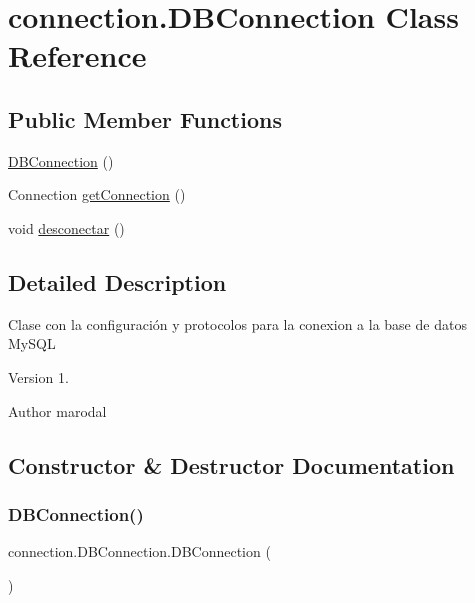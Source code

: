 \hypertarget{classconnection_1_1_d_b_connection}{}\section{connection.\+D\+B\+Connection Class Reference}
\label{classconnection_1_1_d_b_connection}
\subsection*{Public Member Functions}
\begin{DoxyCompactItemize}
\item 
\mbox{\hyperlink{classconnection_1_1_d_b_connection_a588cbdf335610da01f0c6c751e8f5593}{D\+B\+Connection}} ()
\item 
Connection \mbox{\hyperlink{classconnection_1_1_d_b_connection_a634bde0075766d2e075830387f970879}{get\+Connection}} ()
\item 
void \mbox{\hyperlink{classconnection_1_1_d_b_connection_a194f7d7848f479d3779f0c356d2ff6fa}{desconectar}} ()
\end{DoxyCompactItemize}


\subsection{Detailed Description}
Clase con la configuración y protocolos para la conexion a la base de datos My\+S\+QL \begin{DoxyVersion}{Version}
1. 
\end{DoxyVersion}
\begin{DoxyAuthor}{Author}
marodal 
\end{DoxyAuthor}


\subsection{Constructor \& Destructor Documentation}
\mbox{\label{classconnection_1_1_d_b_connection_a588cbdf335610da01f0c6c751e8f5593}} 
\subsubsection{\texorpdfstring{DBConnection()}{DBConnection()}}
{\footnotesize\ttfamily connection.\+D\+B\+Connection.\+D\+B\+Connection (\begin{DoxyParamCaption}{ }\end{DoxyParamCaption})\hspace{0.3cm}{\ttfamily [inline]}}

